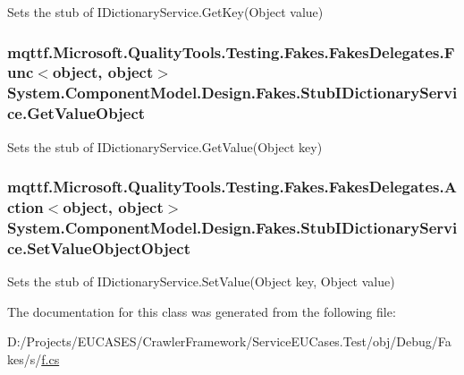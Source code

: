 Sets the stub of I\-Dictionary\-Service.\-Get\-Key(\-Object value)

\hypertarget{class_system_1_1_component_model_1_1_design_1_1_fakes_1_1_stub_i_dictionary_service_a7facfe071b117242e59e1b7bf2fbca2e}{
\subsubsection[{Get\-Value\-Object}]{\setlength{\rightskip}{0pt plus 5cm}mqttf.\-Microsoft.\-Quality\-Tools.\-Testing.\-Fakes.\-Fakes\-Delegates.\-Func$<$object, object$>$ System.\-Component\-Model.\-Design.\-Fakes.\-Stub\-I\-Dictionary\-Service.\-Get\-Value\-Object}}\label{class_system_1_1_component_model_1_1_design_1_1_fakes_1_1_stub_i_dictionary_service_a7facfe071b117242e59e1b7bf2fbca2e}


Sets the stub of I\-Dictionary\-Service.\-Get\-Value(\-Object key)

\hypertarget{class_system_1_1_component_model_1_1_design_1_1_fakes_1_1_stub_i_dictionary_service_a07b24a19abfbef8129cf3e052e2e799e}{
\subsubsection[{Set\-Value\-Object\-Object}]{\setlength{\rightskip}{0pt plus 5cm}mqttf.\-Microsoft.\-Quality\-Tools.\-Testing.\-Fakes.\-Fakes\-Delegates.\-Action$<$object, object$>$ System.\-Component\-Model.\-Design.\-Fakes.\-Stub\-I\-Dictionary\-Service.\-Set\-Value\-Object\-Object}}\label{class_system_1_1_component_model_1_1_design_1_1_fakes_1_1_stub_i_dictionary_service_a07b24a19abfbef8129cf3e052e2e799e}


Sets the stub of I\-Dictionary\-Service.\-Set\-Value(\-Object key, Object value)



The documentation for this class was generated from the following file\-:\begin{DoxyCompactItemize}
\item 
D\-:/\-Projects/\-E\-U\-C\-A\-S\-E\-S/\-Crawler\-Framework/\-Service\-E\-U\-Cases.\-Test/obj/\-Debug/\-Fakes/s/\hyperlink{s_2f_8cs}{f.\-cs}\end{DoxyCompactItemize}
